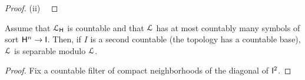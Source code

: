 \documentclass[10pt,oneside]{amsproc}
\newcommand{\mylabel}[1]{{#1}\hfill}
\renewenvironment{itemize}
  {\begin{list}{$\triangleright$}{%
  \setlength{\parskip}{0mm}
  \setlength{\topsep}{.4\baselineskip}
  \setlength{\rightmargin}{0mm}
  \setlength{\listparindent}{0mm}
  \setlength{\itemindent}{0mm}
  \setlength{\labelwidth}{3ex}
  \setlength{\itemsep}{.2\baselineskip}
  \setlength{\parsep}{.2\baselineskip}
  \setlength{\partopsep}{0mm}
  \setlength{\labelsep}{1ex}
  \setlength{\leftmargin}{\labelwidth+\labelsep}
  \let\makelabel\mylabel}}{%
\end{list}}
\renewcommand*{\emph}[1]{%
   \smash{\tikz[baseline]\node[rectangle, fill=teal!25, rounded corners, inner xsep=0.5ex, inner ysep=0.2ex, anchor=base, minimum height = 2.7ex]{\strut #1};}}
\begin{document}
{\begin{proof}
  (ii) \ 
\end{proof}

\begin{proposition}
  Assume that ${\EuScript L}_{\sf H}$ is countable and that ${\EuScript L}$ has at most countably many symbols of sort ${\sf H}^n\to {\sf I}$.
  Then, if $I$ is a second countable (the topology has a countable base), ${\EuScript L}$ is separable modulo ${\EuScript L}$.
\end{proposition}

\begin{proof}
  Fix a countable filter of compact neighborhoods of the diagonal of ${\sf I}^2$.  
\end{proof}











}
\end{document}
